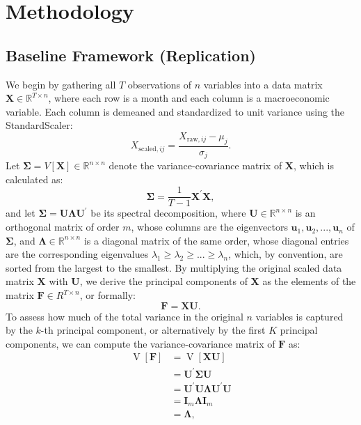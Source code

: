 
\section{Methodology}
\subsection{Baseline Framework (Replication)}

We begin by gathering all $T$ observations of $n$ variables into a data matrix $\mathbf X \in \mathbb R ^{T\times n}$, where each row is a month and each column is a macroeconomic variable. Each column is demeaned and standardized to unit variance using the StandardScaler: 
\begin{equation}
    X_{\text{scaled},ij}=\frac{X_{\text{raw},ij}-\mu_j}{\sigma_j}.
\end{equation}
Let $\mathbf \Sigma=V[\mathbf X]\in \mathbb R^{n\times n}$ denote the variance-covariance matrix of $\mathbf X$, which is calculated as: 
\begin{equation}
    \mathbf \Sigma=\frac{1}{T-1} \mathbf X^{\prime} \mathbf X,
\end{equation}
and let $\mathbf \Sigma =\mathbf {U \Lambda U}^\prime$ be its spectral decomposition, where $\mathbf U \in \mathbb R^{n\times n}$ is an orthogonal matrix of order $m$, whose columns are the eigenvectors $\mathbf u_1, \mathbf u_2,...,\mathbf u_n$ of $\mathbf \Sigma$, and $\mathbf \Lambda \in \mathbb R^{n\times n}$ is a diagonal matrix of the same order, whose diagonal entries are the corresponding eigenvalues $\lambda_1\ge\lambda_2\ge...\ge \lambda_n$, which, by convention, are sorted from the largest to the smallest. By multiplying the original scaled data matrix $\mathbf X$ with $\mathbf U$, we derive the principal components of $\mathbf X$ as the elements of the matrix $\mathbf F\in R^{T \times n}$, or formally: 
\begin{equation}
    \mathbf F = \mathbf X \mathbf U.
\end{equation}
To assess how much of the total variance in the original $n$ variables is captured by the $k$-th principal component, or alternatively by the first $K$ principal components, we can compute the variance-covariance matrix of $\mathbf F$ as:
\begin{equation}
    \begin{aligned}
        \operatorname{V}[\mathbf F] &= \operatorname{V}[\mathbf {XU}]\\
        &= \mathbf{U^\prime \Sigma U}\\
        &= \mathbf{U^\prime U \Lambda U^\prime U}\\
        &= \mathbf{I}_m\mathbf{\Lambda I}_m\\ 
        &= \mathbf{\Lambda}, 
    \end{aligned}
\end{equation} 
